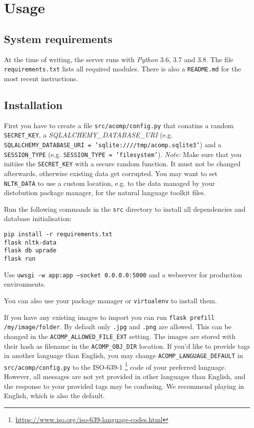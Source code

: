 \section{Usage}
\label{g14:sec:usage}

\subsection{System requirements}
\label{g14:sec:usage:requirements}
At the time of writing, the server runs with \textit{Python} 3.6, 3.7 and 3.8. The file
\texttt{requirements.txt} lists all required modules.
There is also a \texttt{README.md} for the most recent instructions.

\subsection{Installation}
\label{g14:sec:usage:instllation}
First you have to create a file \texttt{src/acomp/config.py} that conatins
a random \texttt{SECRET\_KEY}, a \textit{SQLALCHEMY\_DATABASE\_URI}
(e.g. \texttt{SQLALCHEMY\_DATABASE\_URI = 'sqlite:////tmp/acomp.sqlite3'}) and
a \texttt{SESSION\_TYPE} (e.g. \texttt{SESSION\_TYPE = 'filesystem'}).
\textit{Note:} Make sure that you initiise the \texttt{SECRET\_KEY} with a secure random function.
It must not be changed afterwards, otherwise existing data get corrupted.
You may want to set \texttt{NLTK\_DATA} to use a custom location, e.g. to the data
managed by your distobution package manager, for the natural language toolkit files.

Run the following commands in the \texttt{src} directory to install all dependencies and
database initialisation:

\begin{verbatim}
pip install -r requirements.txt
flask nltk-data
flask db uprade
flask run
\end{verbatim}

Use \texttt{uwsgi -w app:app --socket 0.0.0.0:5000} and a webserver for production environments.

You can also use your package manager or \texttt{virtualenv} to install them.

If you have any existing images to import you can run
\texttt{flask prefill /my/image/folder}. By default only \texttt{.jpg} and \texttt{.png}
are allowed. This can be changed in the \texttt{ACOMP\_ALLOWED\_FILE\_EXT} setting. The
images are stored with their hash as filename in the \texttt{ACOMP\_OBJ\_DIR} location.
If you'd like to provide tags in another language than English, you may change
\texttt{ACOMP\_LANGUAGE\_DEFAULT} in \texttt{src/acomp/config.py} to the
ISO-639-1 \footnote{\url{https://www.iso.org/iso-639-language-codes.html}} code of your preferred language.
However, all messages are not yet provided in other languages than English,
and the response to your provided tags may be confusing.
We recommend playing in English, which is also the default.

